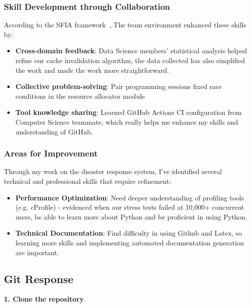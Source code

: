 \documentclass[a4paper, 11pt]{report}
\begin{document}
\subsubsection{Skill Development through Collaboration}
According to the SFIA framework~\cite{sfia}, The team environment enhanced these skills by:
\begin{itemize}
    \item \textbf{Cross-domain feedback}: Data Science members' statistical analysis helped refine our cache invalidation algorithm, the data collected has also simplified the work and made the work more straightforward.
    \item \textbf{Collective problem-solving}: Pair programming sessions fixed race conditions in the resource allocator module
    \item \textbf{Tool knowledge sharing}: Learned GitHub Actions CI configuration from Computer Science teammate, which really helps me enhance my skills and understanding of GitHub.
\end{itemize}

\subsubsection{Areas for Improvement}  
Through my work on the disaster response system, I've identified several technical and professional skills that require refinement: 
\begin{itemize}
    \item \textbf{Performance Optimization}: Need deeper understanding of profiling tools (e.g. cProfile) - evidenced when our stress tests failed at 10,000+ concurrent users, be able to learn more about Python and be proficient in using Python. 
    \item \textbf{Technical Documentation}: Find difficulty in using Github and Latex, so learning more skills and implementing automated documentation generation are important.
\end{itemize}

\newpage

\subsection*{Git Response}

\textbf{1. Clone the repository}
\end{document}
